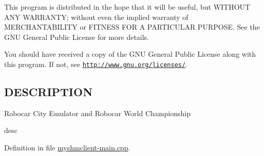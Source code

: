 This program is distributed in the hope that it will be useful, but W\-I\-T\-H\-O\-U\-T A\-N\-Y W\-A\-R\-R\-A\-N\-T\-Y; without even the implied warranty of M\-E\-R\-C\-H\-A\-N\-T\-A\-B\-I\-L\-I\-T\-Y or F\-I\-T\-N\-E\-S\-S F\-O\-R A P\-A\-R\-T\-I\-C\-U\-L\-A\-R P\-U\-R\-P\-O\-S\-E. See the G\-N\-U General Public License for more details.

You should have received a copy of the G\-N\-U General Public License along with this program. If not, see \href{http://www.gnu.org/licenses/}{\tt http\-://www.\-gnu.\-org/licenses/}.\hypertarget{traffic_8cpp_DESCRIPTION}{}\subsection{D\-E\-S\-C\-R\-I\-P\-T\-I\-O\-N}\label{traffic_8cpp_DESCRIPTION}
Robocar City Emulator and Robocar World Championship

desc 

Definition in file \hyperlink{myshmclient-main_8cpp_source}{myshmclient-\/main.\-cpp}.

